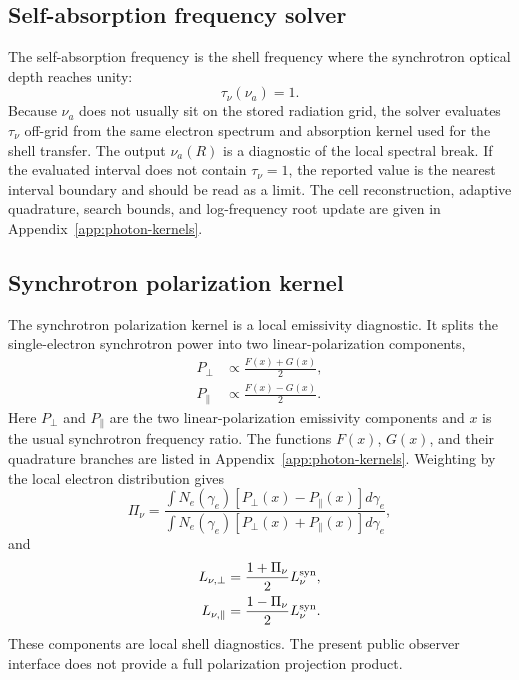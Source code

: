 \documentclass[twocolumn]{aastex702}
\begin{document}
\subsection{Self-absorption frequency solver}

The self-absorption frequency is the shell frequency where the synchrotron
optical depth reaches unity:
\begin{equation}
\tau_\nu(\nu_a)=1 .
\end{equation}
Because \(\nu_a\) does not usually sit on the stored radiation grid, the solver
evaluates \(\tau_\nu\) off-grid from the same electron spectrum and absorption
kernel used for the shell transfer.  The output \(\nu_a(R)\) is a diagnostic of
the local spectral break.  If the evaluated interval does not contain
\(\tau_\nu=1\), the reported value is the nearest interval boundary and should be
read as a limit.  The cell reconstruction, adaptive quadrature, search bounds,
and log-frequency root update are given in
Appendix~\ref{app:photon-kernels}.

\subsection{Synchrotron polarization kernel}

The synchrotron polarization kernel is a local emissivity diagnostic.  It splits
the single-electron synchrotron power into two linear-polarization components,
\begin{equation}
\begin{aligned}
P_\perp&\propto\frac{F(x)+G(x)}{2},\\
P_\parallel&\propto\frac{F(x)-G(x)}{2}.
\end{aligned}
\end{equation}
Here \(P_\perp\) and \(P_\parallel\) are the two linear-polarization emissivity
components and \(x\) is the usual synchrotron frequency ratio.  The functions
\(F(x)\), \(G(x)\), and their quadrature branches are listed in
Appendix~\ref{app:photon-kernels}.  Weighting by the local electron distribution
gives
\begin{equation}
\Pi_\nu=
\frac{\int N_e(\gamma_e)[P_\perp(x)-P_\parallel(x)]d\gamma_e}
{\int N_e(\gamma_e)[P_\perp(x)+P_\parallel(x)]d\gamma_e},
\end{equation}
and
\begin{equation}
\begin{aligned}
L_{\nu,\perp}&=\frac{1+\Pi_\nu}{2}L_\nu^{\rm syn},\\
L_{\nu,\parallel}&=\frac{1-\Pi_\nu}{2}L_\nu^{\rm syn}.
\end{aligned}
\end{equation}
These components are local shell diagnostics.  The present public observer
interface does not provide a full polarization projection product.
\end{document}
